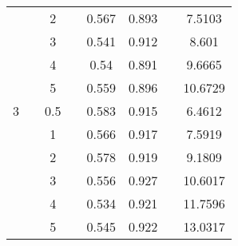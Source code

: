 \documentclass[12pt]{article}
\begin{document}
\begin{table}[!ht]
\begin{tabular}{clclcllc}
                                                  &  & 2                                              &  & 0.567                        & 0.893                                           &  & 7.5103                                                                    \\
                                                  &  & 3                                              &  & 0.541                        & 0.912                                           &  & 8.601                                                                     \\
                                                  &  & 4                                              &  & 0.54                         & 0.891                                           &  & 9.6665                                                                    \\
                                                  &  & 5                                              &  & 0.559                        & 0.896                                           &  & 10.6729                                                                   \\ \midrule
3                                                 &  & 0.5                                            &  & 0.583                        & 0.915                                           &  & 6.4612                                                                    \\
                                                  &  & 1                                              &  & 0.566                        & 0.917                                           &  & 7.5919                                                                    \\
                                                  &  & 2                                              &  & 0.578                        & 0.919                                           &  & 9.1809                                                                    \\
                                                  &  & 3                                              &  & 0.556                        & 0.927                                           &  & 10.6017                                                                   \\
                                                  &  & 4                                              &  & 0.534                        & 0.921                                           &  & 11.7596                                                                   \\
                                                  &  & 5                                              &  & 0.545                        & 0.922                                           &  & 13.0317                                                                   \\ \bottomrule
\end{tabular}
\label{tab:B}
\end{table}
\end{document}
